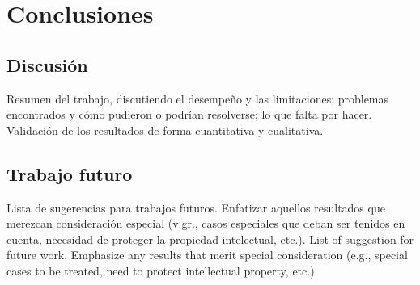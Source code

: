 \section{Conclusiones}

\subsection{Discusión}
Resumen del trabajo, discutiendo el desempeño y las limitaciones; problemas encontrados y cómo pudieron o podrían resolverse; lo que falta por hacer.
Validación de los resultados de forma cuantitativa y cualitativa.

\subsection{Trabajo futuro}
Lista de sugerencias para trabajos futuros. Enfatizar aquellos resultados que merezcan consideración especial (v.gr., casos especiales que deban ser tenidos en cuenta, necesidad de proteger la propiedad intelectual, etc.). 
List of suggestion for future work. Emphasize any results that merit special consideration (e.g., special cases to be treated, need to protect intellectual property, etc.).
